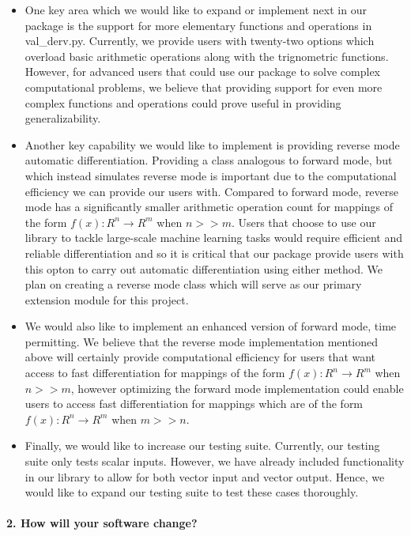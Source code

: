\documentclass[11pt]{article}
\begin{document}
\begin{itemize}
\item
  One key area which we would like to expand or implement next in our
  package is the support for more elementary functions and operations in
  val\_derv.py. Currently, we provide users with twenty-two options
  which overload basic arithmetic operations along with the trignometric
  functions. However, for advanced users that could use our package to
  solve complex computational problems, we believe that providing
  support for even more complex functions and operations could prove
  useful in providing generalizability.
\item
  Another key capability we would like to implement is providing reverse
  mode automatic differentiation. Providing a class analogous to forward
  mode, but which instead simulates reverse mode is important due to the
  computational efficiency we can provide our users with. Compared to
  forward mode, reverse mode has a significantly smaller arithmetic
  operation count for mappings of the form
  \(f(x): R^{n} \rightarrow R^{m}\) when \(n >> m\). Users that choose
  to use our library to tackle large-scale machine learning tasks would
  require efficient and reliable differentiation and so it is critical
  that our package provide users with this opton to carry out automatic
  differentiation using either method. We plan on creating a reverse
  mode class which will serve as our primary extension module for this
  project.
\item
  We would also like to implement an enhanced version of forward mode,
  time permitting. We believe that the reverse mode implementation
  mentioned above will certainly provide computational efficiency for
  users that want access to fast differentiation for mappings of the
  form \(f(x): R^{n} \rightarrow R^{m}\) when \(n >> m\), however
  optimizing the forward mode implementation could enable users to
  access fast differentiation for mappings which are of the form
  \(f(x): R^{n} \rightarrow R^{m}\) when \(m >> n\).
\item
  Finally, we would like to increase our testing suite. Currently, our
  testing suite only tests scalar inputs. However, we have already
  included functionality in our library to allow for both vector input
  and vector output. Hence, we would like to expand our testing suite to
  test these cases thoroughly.
\end{itemize}

\hypertarget{how-will-your-software-change}{%
\paragraph{2. How will your software
change?}\label{how-will-your-software-change}}
\end{document}
